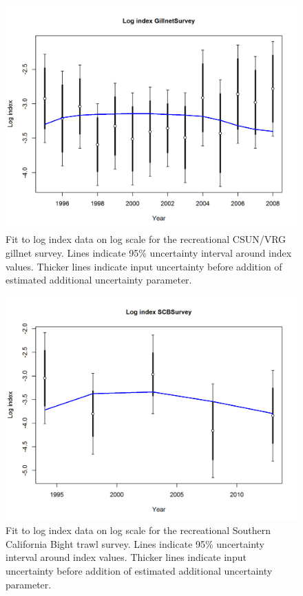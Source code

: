\documentclass[12pt,]{article}
\begin{document}
\FloatBarrier

\begin{figure}[htbp]
\centering
\includegraphics{r4ss/plots_mod1/index5_logcpuefit_GillnetSurvey.png}
\caption{Fit to log index data on log scale for the recreational
CSUN/VRG gillnet survey. Lines indicate 95\% uncertainty interval around
index values. Thicker lines indicate input uncertainty before addition
of estimated additional uncertainty parameter.
\label{fig:GillnetSurvey_indexfit}}
\end{figure}

\FloatBarrier

\begin{figure}[htbp]
\centering
\includegraphics{r4ss/plots_mod1/index5_logcpuefit_SCBSurvey.png}
\caption{Fit to log index data on log scale for the recreational
Southern California Bight trawl survey. Lines indicate 95\% uncertainty
interval around index values. Thicker lines indicate input uncertainty
before addition of estimated additional uncertainty parameter.
\label{fig:SCBSurvey_indexfit}}
\end{figure}
\end{document}
